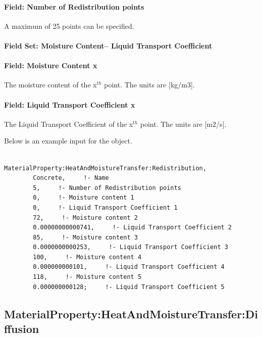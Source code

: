 \paragraph{Field: Number of Redistribution points}\label{field-number-of-redistribution-points}

A maximum of 25 points can be specified.

\paragraph{Field Set: Moisture Content-- Liquid Transport Coefficient}\label{field-set-moisture-content-liquid-transport-coefficient-1}

\paragraph{Field: Moisture Content x}\label{field-moisture-content-x-2}

The moisture content of the x\(^{th}\) point. The units are {[}kg/m3{]}.

\paragraph{Field: Liquid Transport Coefficient x}\label{field-liquid-transport-coefficient-x-1}

The Liquid Transport Coefficient of the x\(^{th}\) point. The units are {[}m2/s{]}.

Below is an example input for the object.

\begin{lstlisting}

MaterialProperty:HeatAndMoistureTransfer:Redistribution,
        Concrete,     !- Name
        5,     !- Number of Redistribution points
        0,     !- Moisture content 1
        0,     !- Liquid Transport Coefficient 1
        72,     !- Moisture content 2
        0.00000000000741,     !- Liquid Transport Coefficient 2
        85,     !- Moisture content 3
        0.0000000000253,     !- Liquid Transport Coefficient 3
        100,     !- Moisture content 4
        0.000000000101,     !- Liquid Transport Coefficient 4
        118,     !- Moisture content 5
        0.000000000128;     !- Liquid Transport Coefficient 5
\end{lstlisting}

\subsection{MaterialProperty:HeatAndMoistureTransfer:Diffusion}\label{materialpropertyheatandmoisturetransferdiffusion}

